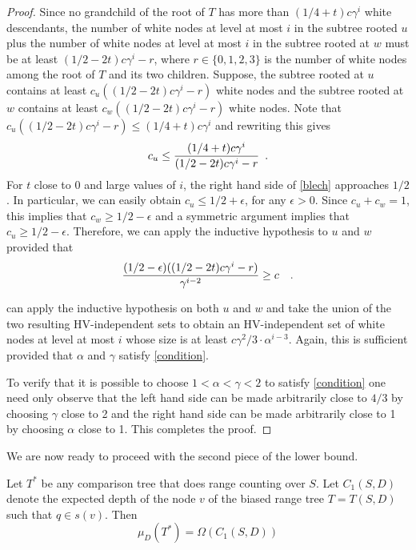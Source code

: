 \documentclass[lotsofwhite,charterfonts]{patmorin}
\begin{document}
\begin{proof}
Since no grandchild of the root of $T$ has more than $(1/4+t)c\gamma^i$ white
descendants, the number of white nodes at level at most
$i$ in the subtree rooted $u$ plus the number of white nodes at level
at most $i$ in the subtree rooted at $w$ must be at least
$(1/2-2t)c\gamma^i-r$, where $r\in\{0,1,2,3\}$ is the number of white
nodes among the root of $T$ and its two children.  Suppose, the
subtree rooted at $u$ contains at least $c_u((1/2-2t)c\gamma^i-r)$ white nodes
and the subtree rooted at $w$ contains at least $c_w((1/2-2t)c\gamma^i-r)$
white nodes.  Note that
$c_u((1/2-2t)c\gamma^i-r) \le (1/4+t)c\gamma^i$ and rewriting this
gives
\begin{equation}
   c_u \le \frac{(1/4+t)c\gamma^i}{(1/2-2t)c\gamma^i-r} \enspace .
   \eqlabel{blech}
\end{equation}
For $t$ close to $0$ and large values of $i$, the right hand side of
\eqref{blech} approaches $1/2$.  In particular, we can easily obtain
$c_u \le 1/2+\epsilon$, for any $\epsilon > 0$.  
Since $c_u+c_w=1$, this implies that $c_w \ge 1/2-\epsilon$
and a symmetric argument implies that $c_u \ge 1/2-\epsilon$.
Therefore, we can apply the inductive hypothesis to $u$ and $w$
provided that
\begin{equation}
  \frac {(1/2-\epsilon)((1/2-2t)c\gamma^i - r)}{\gamma^{i-2}} \ge c \enspace \eqlabel{condition} \enspace .
\end{equation}

can apply the inductive hypothesis on both $u$ and $w$ and take the
union of the two resulting HV-independent sets to obtain an
HV-independent set of white nodes at level at most $i$ whose size is
at least $c\gamma^2/3\cdot\alpha^{i-3}$.  Again, this is sufficient
provided that $\alpha$ and $\gamma$ satisfy \eqref{condition}.

To verify that it is possible to choose $1 < \alpha <\gamma < 2$ to
satisfy \eqref{condition} one need only observe that the left hand
side can be made arbitrarily close to $4/3$ by choosing $\gamma$ close
to 2 and the right hand side can be made arbitrarily close to 1 by
choosing $\alpha$ close to 1.  This completes the proof.
\end{proof}

We are now ready to proceed with the second piece of the lower bound.

\begin{lem}
Let $T^*$ be any comparison tree that does range counting over $S$. Let
$C_1(S,D)$ denote the expected depth of the node $v$ of the biased
range tree $T=T(S,D)$ such that $q\in s(v)$.  Then
\[
    \mu_D(T^*) = \Omega(C_1(S,D))
\]
\end{lem}
\end{document}
